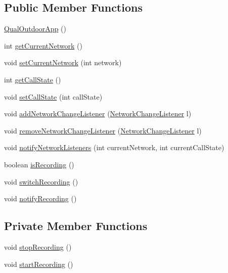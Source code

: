 \subsection*{Public Member Functions}
\begin{DoxyCompactItemize}
\item 
\hyperlink{classcom_1_1qualoutdoor_1_1recorder_1_1QualOutdoorApp_a863e6a3fe7d020d62629cc47049a5618}{Qual\-Outdoor\-App} ()
\item 
int \hyperlink{classcom_1_1qualoutdoor_1_1recorder_1_1QualOutdoorApp_ac9fdf8864e00f880803658ef94e8f20b}{get\-Current\-Network} ()
\item 
void \hyperlink{classcom_1_1qualoutdoor_1_1recorder_1_1QualOutdoorApp_a8d02d25c00d87540548e55b1de410b60}{set\-Current\-Network} (int network)
\item 
int \hyperlink{classcom_1_1qualoutdoor_1_1recorder_1_1QualOutdoorApp_a1d011e7d39b12c3657b5a927fda0ea8f}{get\-Call\-State} ()
\item 
void \hyperlink{classcom_1_1qualoutdoor_1_1recorder_1_1QualOutdoorApp_a195cc6939ad7d5d2dd8aae046ae8fb6a}{set\-Call\-State} (int call\-State)
\item 
void \hyperlink{classcom_1_1qualoutdoor_1_1recorder_1_1QualOutdoorApp_a829786bb3de92bfc6f38ed85d04aa44e}{add\-Network\-Change\-Listener} (\hyperlink{interfacecom_1_1qualoutdoor_1_1recorder_1_1QualOutdoorApp_1_1NetworkChangeListener}{Network\-Change\-Listener} l)
\item 
void \hyperlink{classcom_1_1qualoutdoor_1_1recorder_1_1QualOutdoorApp_a34ce4fb04563b6f5f808866ec9156ac8}{remove\-Network\-Change\-Listener} (\hyperlink{interfacecom_1_1qualoutdoor_1_1recorder_1_1QualOutdoorApp_1_1NetworkChangeListener}{Network\-Change\-Listener} l)
\item 
void \hyperlink{classcom_1_1qualoutdoor_1_1recorder_1_1QualOutdoorApp_a3d9228b4b2a55f80718d82d53fd6ca8c}{notify\-Network\-Listeners} (int current\-Network, int current\-Call\-State)
\item 
boolean \hyperlink{classcom_1_1qualoutdoor_1_1recorder_1_1QualOutdoorApp_a9ab899682caf9bc4eafa3bf236f9b4e4}{is\-Recording} ()
\item 
void \hyperlink{classcom_1_1qualoutdoor_1_1recorder_1_1QualOutdoorApp_af8b76cf31bccb966036a94a3cbe086e1}{switch\-Recording} ()
\item 
void \hyperlink{classcom_1_1qualoutdoor_1_1recorder_1_1QualOutdoorApp_ae1aaa8d84f0e13c8448beb8901a1aafd}{notify\-Recording} ()
\end{DoxyCompactItemize}
\subsection*{Private Member Functions}
\begin{DoxyCompactItemize}
\item 
void \hyperlink{classcom_1_1qualoutdoor_1_1recorder_1_1QualOutdoorApp_aaa95acb3101a265a6ecca3479ccd8298}{stop\-Recording} ()
\item 
void \hyperlink{classcom_1_1qualoutdoor_1_1recorder_1_1QualOutdoorApp_aa6d92737d7715f9b80a8a97c1f3c91b7}{start\-Recording} ()
\end{DoxyCompactItemize}
